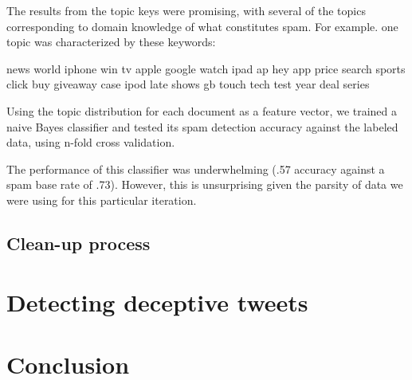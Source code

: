 \documentclass[times, 11pt, twocolumn]{article}
\begin{document}
The results from the topic keys were promising, with several of the topics corresponding to domain knowledge of what constitutes spam.  For example. one topic was characterized by these keywords:

news world iphone win tv apple google watch ipad ap hey  app price search sports click buy giveaway case ipod late shows gb touch  tech test year deal series 

Using the topic distribution for each document as a feature vector, we trained a naive Bayes classifier and tested its spam detection accuracy against the labeled data, using n-fold cross validation.

The performance of this classifier was underwhelming (.57 accuracy against a spam base rate of .73).  However, this is unsurprising given the parsity of data we were using for this particular iteration.
\subsection{Clean-up process}

\section{Detecting deceptive tweets}

\section{Conclusion}
\end{document}
